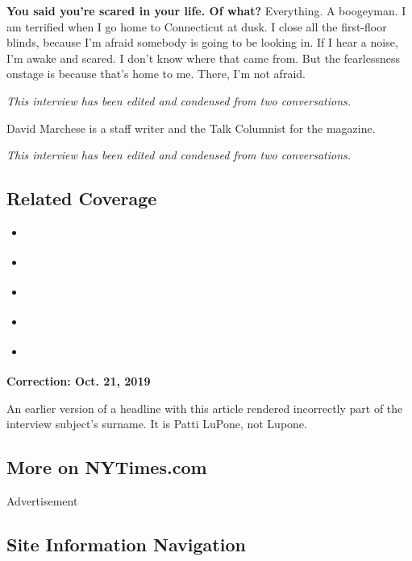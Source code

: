 \textbf{You said you're scared in your life. Of what?} Everything. A
boogeyman. I am terrified when I go home to Connecticut at dusk. I close
all the first-floor blinds, because I'm afraid somebody is going to be
looking in. If I hear a noise, I'm awake and scared. I don't know where
that came from. But the fearlessness onstage is because that's home to
me. There, I'm not afraid.

\emph{This interview has been edited and condensed from two
conversations.}

David Marchese is a staff writer and the Talk Columnist for the
magazine.

\emph{This interview has been edited and condensed from two
conversations.}

\hypertarget{related-coverage}{%
\subsection{Related Coverage}\label{related-coverage}}

\begin{itemize}
\tightlist
\item
  \href{https://www.nytimes3xbfgragh.onion/interactive/2019/10/07/magazine/edward-norton-interview.html}{}
\item
  \href{https://www.nytimes3xbfgragh.onion/interactive/2019/09/15/magazine/pam-grier-interview.html}{}
\item
  \href{https://www.nytimes3xbfgragh.onion/interactive/2019/09/30/magazine/bill-maher-interview.html}{}
\item
  \href{https://www.nytimes3xbfgragh.onion/interactive/2019/08/07/magazine/nicolas-cage-interview.html}{}
\item
  \href{https://www.nytimes3xbfgragh.onion/interactive/2019/09/02/magazine/ram-dass-interview.html}{}
\end{itemize}

\textbf{Correction: Oct. 21, 2019}

An earlier version of a headline with this article rendered incorrectly
part of the interview subject's surname. It is Patti LuPone, not Lupone.

\hypertarget{more-on-nytimescom}{%
\subsection{More on NYTimes.com}\label{more-on-nytimescom}}

Advertisement

\hypertarget{site-information-navigation}{%
\subsection{Site Information
Navigation}\label{site-information-navigation}}


